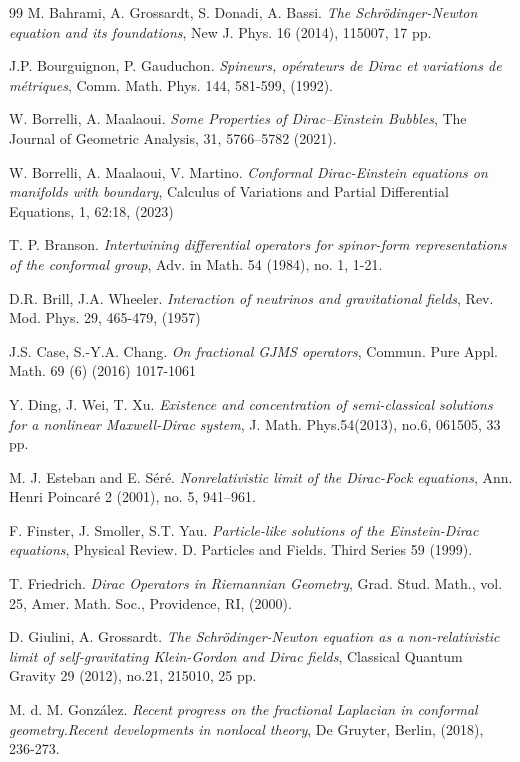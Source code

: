 \documentclass[11pt]{article}
\begin{document}
{\begin{thebibliography}{99}
 M. Bahrami, A. Grossardt, S. Donadi, A. Bassi. \emph{The Schrödinger-Newton equation and its foundations}, New J. Phys. 16 (2014), 115007, 17 pp.

 J.P. Bourguignon, P. Gauduchon. \emph{Spineurs, op\'{e}rateurs de Dirac et variations de m\'{e}triques}, Comm. Math. Phys. 144, 581-599, (1992).

 W. Borrelli, A. Maalaoui. \emph{Some Properties of Dirac--Einstein Bubbles}, The Journal of Geometric Analysis, 31, 5766–5782 (2021).

 W. Borrelli, A. Maalaoui, V. Martino. \emph{Conformal Dirac-Einstein equations on manifolds with boundary}, Calculus of Variations and Partial Differential Equations, 1, 62:18, (2023)

 T. P. Branson. \emph{Intertwining differential operators for spinor-form representations of the conformal group}, Adv. in Math. 54 (1984), no. 1, 1-21.

 D.R. Brill, J.A. Wheeler. \emph{Interaction of neutrinos and gravitational fields}, Rev. Mod. Phys. 29, 465-479, (1957)

 J.S. Case, S.-Y.A. Chang. \emph{On fractional GJMS operators}, Commun. Pure Appl. Math. 69 (6) (2016) 1017-1061

 Y. Ding, J. Wei, T. Xu. \emph{Existence and concentration of semi-classical solutions for a nonlinear Maxwell-Dirac system}, J. Math. Phys.54(2013), no.6, 061505, 33 pp.

 M. J. Esteban and E. S\'{e}r\'{e}. \emph{Nonrelativistic limit of the Dirac-Fock equations}, Ann. Henri Poincar\'{e} 2 (2001), no. 5, 941–961.

 F. Finster, J. Smoller, S.T. Yau. \emph{Particle-like solutions of the Einstein-Dirac equations}, Physical Review. D. Particles and Fields. Third Series 59 (1999).

 T. Friedrich. \emph{Dirac Operators in Riemannian Geometry}, Grad. Stud. Math., vol. 25, Amer. Math. Soc., Providence, RI, (2000).

 D. Giulini, A. Grossardt. \emph{The Schrödinger-Newton equation as a non-relativistic limit of self-gravitating Klein-Gordon and Dirac fields}, Classical Quantum Gravity 29 (2012), no.21, 215010, 25 pp.

 M. d. M. Gonz\'{a}lez. \emph{Recent progress on the fractional Laplacian in conformal geometry.Recent developments in nonlocal theory}, De Gruyter, Berlin, (2018), 236-273. 


\end{thebibliography}}
\end{document}
